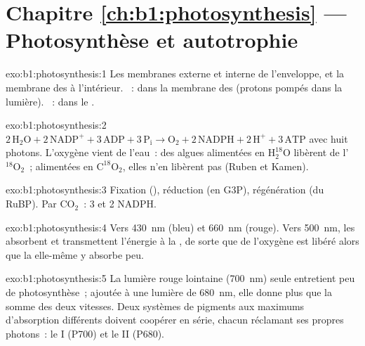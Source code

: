 \section*{Chapitre \ref{ch:b1:photosynthesis} --- Photosynthèse et autotrophie}

\begin{solution}{exo:b1:photosynthesis:1}
Les membranes externe et interne de l'enveloppe, et la membrane des
 à l'intérieur. ~: dans la membrane des
 (protons pompés dans la lumière). ~: dans le
.
\end{solution}

\begin{solution}{exo:b1:photosynthesis:2}
$2\,\mathrm{H_2O} + 2\,\mathrm{NADP^+} + 3\,\mathrm{ADP} + 3\,\mathrm{P_i}
\to \mathrm{O_2} + 2\,\mathrm{NADPH} + 2\,\mathrm{H^+} + 3\,\mathrm{ATP}$
avec huit photons. L'oxygène vient de l'eau~: des algues alimentées en
$\mathrm{H_2^{18}O}$ libèrent de l'$\mathrm{^{18}O_2}$~; alimentées en
$\mathrm{C^{18}O_2}$, elles n'en libèrent pas (Ruben et Kamen).
\end{solution}

\begin{solution}{exo:b1:photosynthesis:3}
Fixation (), réduction (en G3P), régénération (du RuBP). Par
$\mathrm{CO_2}$~: 3  et 2 NADPH.
\end{solution}

\begin{solution}{exo:b1:photosynthesis:4}
Vers \qty{430}{nm} (bleu) et \qty{660}{nm} (rouge). Vers \qty{500}{nm},
les  absorbent et transmettent l'énergie à la ,
de sorte que de l'oxygène est libéré alors que la 
elle-même y absorbe peu.
\end{solution}

\begin{solution}{exo:b1:photosynthesis:5}
La lumière rouge lointaine (\qty{700}{nm}) seule entretient peu de
photosynthèse~; ajoutée à une lumière de \qty{680}{nm}, elle donne plus
que la somme des deux vitesses. Deux systèmes de pigments aux maximums
d'absorption différents doivent coopérer en série, chacun réclamant ses
propres photons~: le  I (P700) et le  II (P680).
\end{solution}

